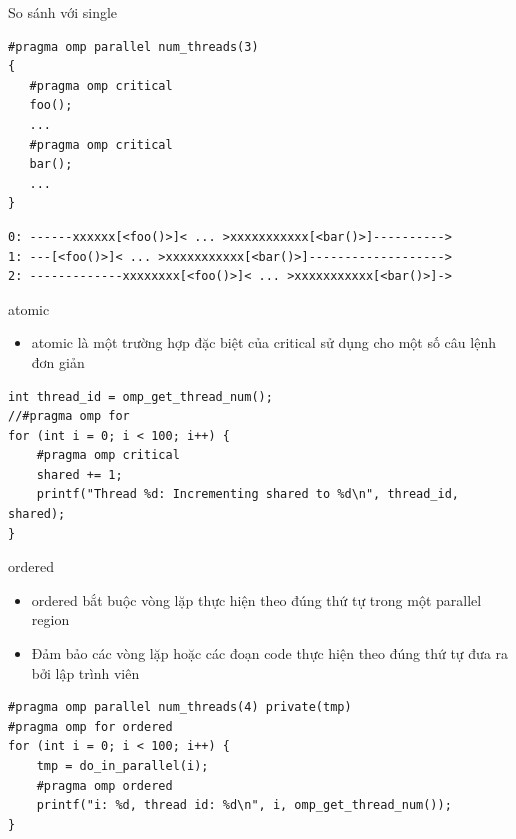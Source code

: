 \documentclass[10pt]{beamer}
\theoremstyle{remark}
\numberwithin{algocf}{section}
\numberwithin{equation}{section}
\numberwithin{dl}{section}
\numberwithin{figure}{section}
\begin{document}
\begin{frame}[fragile]{So sánh với single}
    \begin{verbatim}
#pragma omp parallel num_threads(3)
{
   #pragma omp critical
   foo();
   ...
   #pragma omp critical
   bar();
   ...
}
    \end{verbatim}

    \begin{verbatim}
0: ------xxxxxx[<foo()>]< ... >xxxxxxxxxxx[<bar()>]---------->
1: ---[<foo()>]< ... >xxxxxxxxxxx[<bar()>]------------------->
2: -------------xxxxxxxx[<foo()>]< ... >xxxxxxxxxxx[<bar()>]->
    \end{verbatim}
\end{frame}

\begin{frame}[fragile]{atomic}
    \begin{itemize}
        \item atomic là một trường hợp đặc biệt của critical sử dụng cho một số câu lệnh đơn giản
    \end{itemize}

    \begin{verbatim}
int thread_id = omp_get_thread_num();
//#pragma omp for
for (int i = 0; i < 100; i++) {
    #pragma omp critical
    shared += 1;
    printf("Thread %d: Incrementing shared to %d\n", thread_id, shared);
}
    \end{verbatim}
\end{frame}

\begin{frame}[fragile]{ordered}
    \begin{itemize}
        \item ordered bắt buộc vòng lặp thực hiện theo đúng thứ tự trong một parallel region
        \item Đảm bảo các vòng lặp hoặc các đoạn code thực hiện theo đúng thứ tự đưa ra bởi lập trình viên
    \end{itemize}
    \begin{verbatim}
#pragma omp parallel num_threads(4) private(tmp)
#pragma omp for ordered
for (int i = 0; i < 100; i++) {
    tmp = do_in_parallel(i);
    #pragma omp ordered
    printf("i: %d, thread id: %d\n", i, omp_get_thread_num());
}
    \end{verbatim}
\end{frame}
\end{document}
